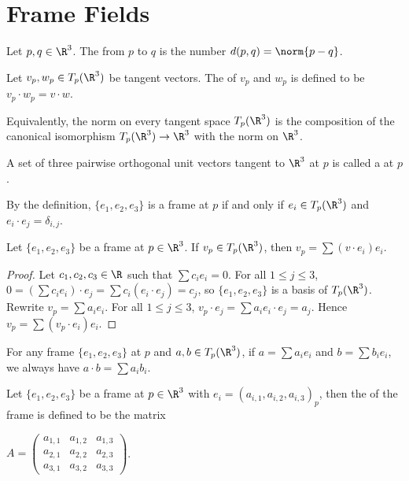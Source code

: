 \documentclass[10pt]{article}
\begin{document}
\section{Frame Fields}
\begin{definition}
    Let $p,q\in{\R}^{3}$. The  from $p$ to $q$ is the number $d(p,q)=\norm{p-q}$.
\end{definition}
\begin{definition}
    Let ${v}_{p},{w}_{p}\in{T}_{p}({\R}^{3})$ be tangent vectors. The  of ${v}_{p}$ and ${w}_{p}$ is defined to be ${v}_{p}\cdot{w}_{p}=v\cdot w$.
\end{definition}
\par
Equivalently, the norm on every tangent space ${T}_{p}({\R}^{3})$ is the composition of the canonical isomorphism ${T}_{p}({\R}^{3})\to{\R}^{3}$ with the norm on ${\R}^{3}$.
\begin{definition}
    A set of three pairwise orthogonal unit vectors tangent to ${\R}^{3}$ at $p$ is called a  at $p$.
\end{definition}
\par
By the definition, $\{{e}_{1},{e}_{2},{e}_{3}\}$ is a frame at $p$ if and only if ${e}_{i}\in{T}_{p}({\R}^{3})$ and ${e}_{i}\cdot{e}_{j}={\delta}_{i,j}$.
\begin{proposition}
    Let $\{{e}_{1},{e}_{2},{e}_{3}\}$ be a frame at $p\in{\R}^{3}$. If ${v}_{p}\in{T}_{p}({\R}^{3})$, then ${v}_{p}=\sum(v\cdot{e}_{i}){e}_{i}$.
\end{proposition}
\begin{proof}
    Let ${c}_{1},{c}_{2},{c}_{3}\in\R$ such that $\sum{c}_{i}{e}_{i}=0$. For all $1\le j\le 3$, $0=(\sum{c}_{i}{e}_{i})\cdot{e}_{j}=\sum{c}_{i}({e}_{i}\cdot{e}_{j})={c}_{j}$, so $\{{e}_{1},{e}_{2},{e}_{3}\}$ is a basis of ${T}_{p}({\R}^{3})$. Rewrite ${v}_{p}=\sum{a}_{i}{e}_{i}$. For all $1\le j\le 3$, ${v}_{p}\cdot{e}_{j}=\sum{a}_{i}{e}_{i}\cdot{e}_{j}={a}_{j}$. Hence ${v}_{p}=\sum({v}_{p}\cdot{e}_{i}){e}_{i}$.
\end{proof}
\par
For any frame $\{{e}_{1},{e}_{2},{e}_{3}\}$ at $p$ and $a,b\in{T}_{p}({\R}^{3})$, if $a=\sum{a}_{i}{e}_{i}$ and $b=\sum{b}_{i}{e}_{i}$, we always have $a\cdot b=\sum{a}_{i}{b}_{i}$.
\begin{definition}
    Let $\{{e}_{1},{e}_{2},{e}_{3}\}$ be a frame at $p\in{\R}^{3}$ with ${e}_{i}={({a}_{i,1},{a}_{i,2},{a}_{i,3})}_{p}$, then the  of the frame is defined to be the matrix
    \begin{center}
        $A=\begin{pmatrix}
            {a}_{1,1} & {a}_{1,2} & {a}_{1,3} \\
            {a}_{2,1} & {a}_{2,2} & {a}_{2,3} \\
            {a}_{3,1} & {a}_{3,2} & {a}_{3,3}
        \end{pmatrix}$.
    \end{center}
\end{definition}
\end{document}
